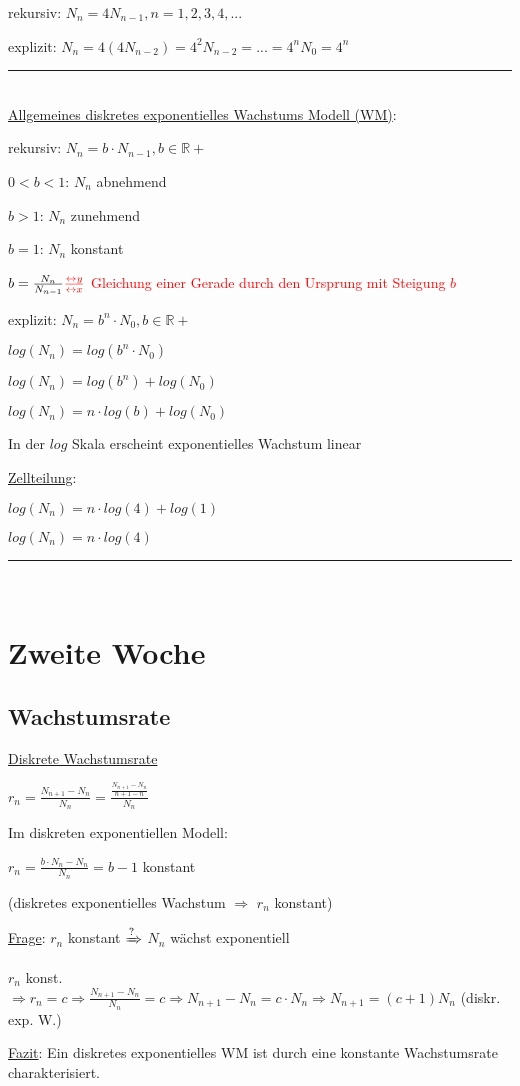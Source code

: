 \documentclass[18pt,a4paper]{scrreprt}
\begin{document}
rekursiv: $N_n = 4N_{n-1}, n = 1, 2, 3, 4, ...$

explizit: $N_n = 4(4N_{n-2}) = 4^2N_{n-2} = ... = 4^nN_0 = 4^n$

\rule{\textwidth}{0.4mm}\\

\uline{Allgemeines diskretes exponentielles Wachstums Modell (WM)}:

rekursiv: $N_n = b \cdot N_{n-1}, b \in \mathbb{R+}$

$0 < b < 1$: $N_n$ abnehmend

$b > 1$: $N_n$ zunehmend

$b = 1$: $N_n$ konstant

$b = \frac{N_n}{N_{n-1}} \textcolor{red}{\frac{\leftrightarrow y}{\leftrightarrow x}}$ \textcolor{red}{Gleichung einer Gerade durch den Ursprung mit Steigung $b$}

explizit: $N_n = b^n \cdot N_0, b \in \mathbb{R+}$

$log(N_n) = log(b^n \cdot N_0)$

$log(N_n) = log(b^n) + log(N_0)$

$log(N_n) = n\cdot log(b) + log(N_0)$

In der $log$ Skala erscheint exponentielles Wachstum linear

\uline{Zellteilung}:

$log(N_n) = n\cdot log(4) + log(1)$

$log(N_n) = n\cdot log(4)$

\rule{\textwidth}{0.4mm}\\

\chapter{Zweite Woche}

\section{Wachstumsrate}

\uline{Diskrete Wachstumsrate}

$r_n = \frac{N_{n+1} - N_n}{N_n} = \frac{\frac{N_{n+1} - N_n}{n+1 -n}}{N_n}$

Im diskreten exponentiellen Modell:

$r_n = \frac{b\cdot N_n - N_n}{N_n} = b-1$ konstant

(diskretes exponentielles Wachstum $\Rightarrow$ $r_n$ konstant)

\uline{Frage}: $r_n$ konstant $\xRightarrow{?}$ $N_n$ wächst exponentiell

$r_n$ konst. $\Rightarrow r_n = c \Rightarrow \frac{N_{n+1} - N_n}{N_n} = c \Rightarrow N_{n+1} - N_n = c\cdot N_n \Rightarrow N_{n+1} = (c+1) N_n$ (diskr. exp. W.)

\uline{Fazit}: Ein diskretes exponentielles WM ist durch eine konstante Wachstumsrate charakterisiert.
\end{document}
